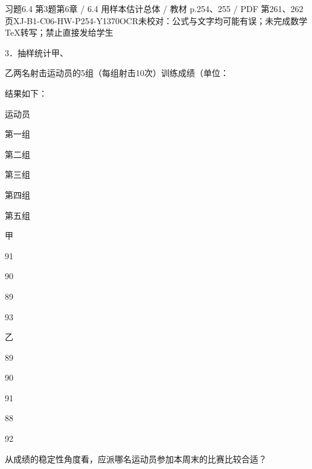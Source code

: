 \begin{bankitem}{习题6.4 第3题}{第6章 / 6.4 用样本估计总体 / 教材 p.254、255 / PDF 第261、262页}{XJ-B1-C06-HW-P254-Y1370}{OCR未校对：公式与文字均可能有误；未完成数学TeX转写；禁止直接发给学生}
\begin{ocrdraft}
\par
3．抽样统计甲、
\par
乙两名射击运动员的5组（每组射击10次）训练成绩（单位：
\par
结果如下：
\par
运动员
\par
第一组
\par
第二组
\par
第三组
\par
第四组
\par
第五组
\par
甲
\par
91
\par
90
\par
89
\par
93
\par
乙
\par
89
\par
90
\par
91
\par
88
\par
92
\par
[教材p.255 / PDF第262页]
\par
从成绩的稳定性角度看，应派哪名运动员参加本周末的比赛比较合适？
\end{ocrdraft}
\end{bankitem}
